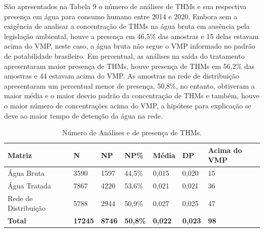 São apresentados na Tabela 9 o número de análises de THMs e sua respectiva presença em água para consumo humano entre 2014 e 2020. Embora sem a exigência de analisar a concentração de THMs na água bruta em ausência pela legislação ambiental, houve a presença em 46,5\% das amostras e 15 delas estavam acima do VMP, neste caso, a água bruta não segue o VMP informado no padrão de potabilidade brasileiro. Em percentual, as análises na saída do tratamento apresentaram maior presença de THMs, houve presença de THMs em 56,2\% das amostras e 44 estavam acima do VMP. As amostras na rede de distribuição apresentaram um percentual menor de presença, 50,8\%, no entanto, obtiveram a maior média e o maior desvio padrão da concentração de THMs e também, houve o maior número de concentrações acima do VMP, a hipótese para explicação se deve ao maior tempo de detenção da água na rede.

\begin{table}[!htb]
\centering
\small
\caption{\small Número de Análises e de presença de THMs.}
\label{tab:com_esp}
    \begin{tabular}{p{3.3cm}p{0.8cm}p{0.8cm}p{0.8cm}p{0.8cm}p{0.7cm}p{2.5cm}}
    \toprule
    \textbf{Matriz} & \textbf{N} & \textbf{NP}&\textbf{NP\%} & \textbf{Média} &\textbf{DP}& \textbf{Acima do VMP}\\ \hline
      Água Bruta   & 3590 & 1597 & 44,5\% & 0,015 & 0,020 & 15 \\
      Água Tratada & 7867 & 4220 & 53,6\% & 0,021 & 0,021 & 36\\
      Rede de Distribuição & 5788 & 2944 & 50,9\% & 0,027 &0,025 & 47\\ \hline
      \textbf{Total} & \textbf{17245} & \textbf{8746} & \textbf{50,8\%} & \textbf{0,022} & \textbf{0,023} &  \textbf{98}\\ \bottomrule
    \end{tabular}
    \label{tab01}
\end{table}


